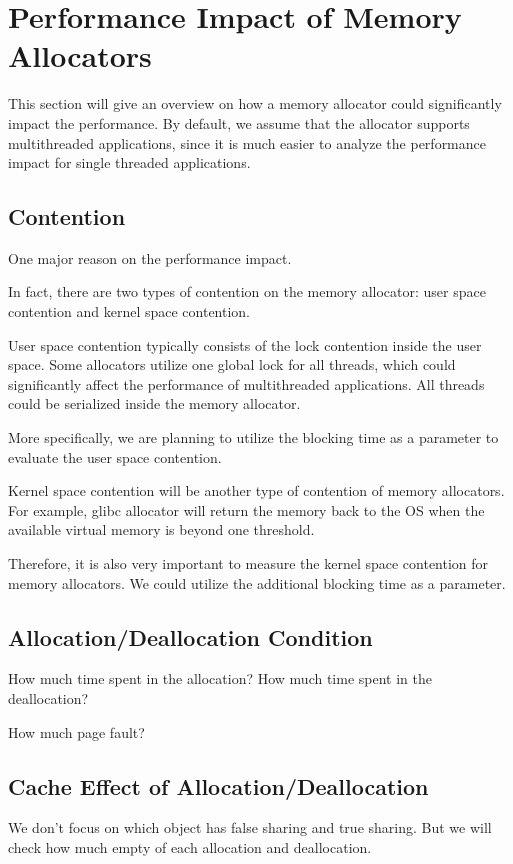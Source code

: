 \section{Performance Impact of Memory Allocators}

This section will give an overview on how a memory allocator could significantly impact the performance. By default, we assume that the allocator supports multithreaded applications, since it is much easier to analyze the performance impact for single threaded applications. 

\subsection{Contention}

One major reason on the performance impact. 

In fact, there are two types of contention on the memory allocator: user space contention and kernel space contention. 

User space contention typically consists of the lock contention inside the user space. Some allocators utilize one global lock for all threads, which could significantly affect the performance of multithreaded applications. All threads could be serialized inside the memory allocator. 

More specifically, we are planning to utilize the blocking time as a parameter to evaluate the user space contention. 

Kernel space contention will be another type of contention of memory allocators. For example, glibc allocator will return the memory back to the OS when the available virtual memory is beyond one threshold. 

Therefore, it is also very important to measure the kernel space contention for memory allocators. We could utilize the additional blocking time as a parameter. 



\subsection{Allocation/Deallocation Condition} 

How much time spent in the allocation? 
How much time spent in the deallocation? 

How much page fault? 

\subsection{Cache Effect of Allocation/Deallocation}

We don't focus on which object has false sharing and true sharing.
But we will check how much empty of each allocation and deallocation. 

 


